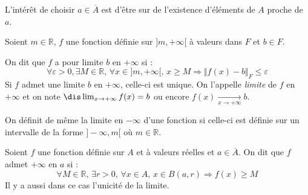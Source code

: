 \documentclass[a4paper,10pt]{report}
\begin{document}
\begin{rem} L'intérêt de choisir $a \in \overline{A}$ est d'être sur de l'existence d'éléments de $A$ \og proche \fg de $a$.
\end{rem}

\begin{defin} Soient $m \in \mathbb{R}$, $f$ une fonction définie sur $]m, + \infty[$ à valeurs dans $F$ et $b \in F$.

\noindent On dit que $f$ a pour limite $b$ en $+ \infty$ si :
$$ \forall \varepsilon>0, \exists M \in \mathbb{R}, \, \forall x \in ]m, + \infty[, \, x \geq M \Rightarrow \Vert f(x)- b \Vert_F \leq \varepsilon$$
 Si $f$ admet une limite $b$ en $+ \infty$, celle-ci est unique. On l'appelle \textit{limite} de $f$ en $+ \infty$ et on note \newline $\dis \lim_{x \rightarrow + \infty} f(x) = b$ ou encore $f(x) \underset{x \rightarrow + \infty}{\rightarrow} b$.
\end{defin}

\begin{rem} On définit de même la limite en $- \infty$ d'une fonction si celle-ci est définie sur un intervalle de la forme $]- \infty, m[$ où $m \in \mathbb{R}$.
\end{rem}
%
%

\begin{defin} Soient $f$ une fonction définie sur $A$ et à valeurs réelles et $a \in \overline{A}$. On dit que $f$ admet $+ \infty$ en $a$ si :
$$ \forall M \in \mathbb{R}, \, \exists r > 0, \, \forall x \in A, \, x \in B(a,r) \Rightarrow f(x) \geq M$$
Il y a aussi dans ce cas l'unicité de la limite.
\end{defin}
\end{document}

